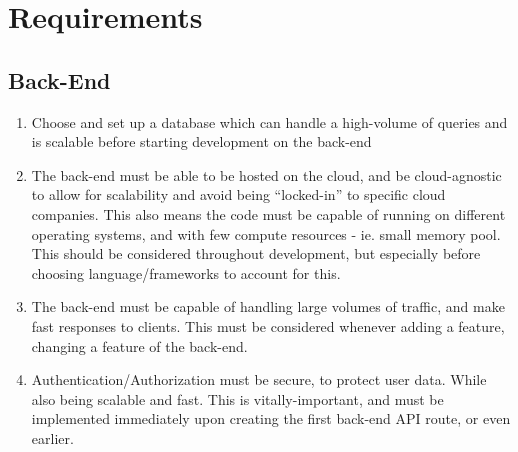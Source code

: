 \documentclass[a4paper,11pt]{report}
\begin{document}
\chapter{Requirements}
\section{Back-End}
\begin{enumerate}
    \item Choose and set up a database which can handle a high-volume of queries
    and is scalable before starting development on the back-end

    \item The back-end must be able to be hosted on the cloud, and be
    cloud-agnostic to allow for scalability and avoid being “locked-in” to
    specific cloud companies. This also means the code must be capable of
    running on different operating systems, and with few compute resources - ie.
    small memory pool. This should be considered throughout development, but
    especially before choosing language/frameworks to account for this.

    \item The back-end must be capable of handling large volumes of traffic, and
    make fast responses to clients. This must be considered whenever adding a
    feature, changing a feature of the back-end.

    \item Authentication/Authorization must be secure, to protect user data.
    While also being scalable and fast. This is vitally-important, and must be
    implemented immediately upon creating the first back-end API route, or even
    earlier.
\end{enumerate}
\end{document}
